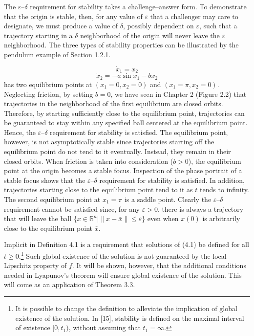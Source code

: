 The $\varepsilon$–$\delta$ requirement for stability takes a challenge–answer form. To demonstrate that the origin is stable, then, for any value of $\varepsilon$ that a challenger may care to designate, we must produce a value of $\delta$, possibly dependent on $\varepsilon$, such that a trajectory starting in a $\delta$ neighborhood of the origin will never leave the $\varepsilon$ neighborhood. The three types of stability properties can be illustrated by the pendulum example of Section 1.2.1.

\[
\dot{x}_1 = x_2
\]
\[
\dot{x}_2 = - a \sin x_1 - b x_2
\]
has two equilibrium points at $(x_1 = 0, x_2 = 0)$ and $(x_1 = \pi, x_2 = 0)$. Neglecting friction, by setting $b = 0$, we have seen in Chapter 2 (Figure 2.2) that trajectories in the neighborhood of the first equilibrium are closed orbits. Therefore, by starting sufficiently close to the equilibrium point, trajectories can be guaranteed to stay within any specified ball centered at the equilibrium point. Hence, the $\varepsilon$–$\delta$ requirement for stability is satisfied. The equilibrium point, however, is not asymptotically stable since trajectories starting off the equilibrium point do not tend to it eventually. Instead, they remain in their closed orbits. When friction is taken into consideration ($b > 0$), the equilibrium point at the origin becomes a stable focus. Inspection of the phase portrait of a stable focus shows that the $\varepsilon$–$\delta$ requirement for stability is satisfied. In addition, trajectories starting close to the equilibrium point tend to it as $t$ tends to infinity. The second equilibrium point at $x_1 = \pi$ is a saddle point. Clearly the $\varepsilon$–$\delta$ requirement cannot be satisfied since, for any $\varepsilon > 0$, there is always a trajectory that will leave the ball $\{ x \in \mathbb{R}^n \mid \|x - \bar{x}\| \le \varepsilon \}$ even when $x(0)$ is arbitrarily close to the equilibrium point $\bar{x}$.

Implicit in Definition 4.1 is a requirement that solutions of (4.1) be defined for all $t \ge 0$.\footnote{It is possible to change the definition to alleviate the implication of global existence of the solution. In [15], stability is defined on the maximal interval of existence $[0,t_1)$, without assuming that $t_1 = \infty$.} Such global existence of the solution is not guaranteed by the local Lipschitz property of $f$. It will be shown, however, that the additional conditions needed in Lyapunov’s theorem will ensure global existence of the solution. This will come as an application of Theorem 3.3.

